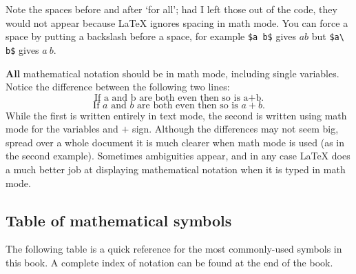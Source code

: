 Note the spaces before and after `for all'; had I left those out of the code, they would not appear because \LaTeX{} ignores spacing in math mode. You can force a space by putting a backslash before a space, for example \lstinline|$a b$| gives $a b$ but \lstinline|$a\ b$| gives $a\ b$.

\textbf{All} mathematical notation should be in math mode, including single variables. Notice the difference between the following two lines:
\[ \text{If a and b are both even then so is a+b.} \]
\[ \text{If } a \text{ and } b \text{ are both even then so is } a+b \text{.} \]
While the first is written entirely in text mode, the second is written using math mode for the variables and $+$ sign. Although the differences may not seem big, spread over a whole document it is much clearer when math mode is used (as in the second example). Sometimes ambiguities appear, and in any case \LaTeX{} does a much better job at displaying mathematical notation when it is typed in math mode.

\newpage
\subsection*{Table of mathematical symbols}

The following table is a quick reference for the most commonly-used symbols in this book. A complete index of notation can be found at the end of the book.

